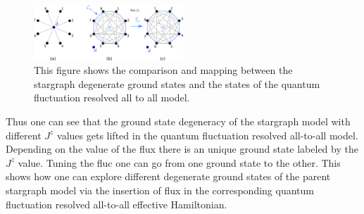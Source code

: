 \documentclass[reprint,prb,superscriptaddress]{revtex4-2}
\begin{document}
\begin{figure}[!hb]
\centering
\includegraphics[width=0.5\textwidth]{plt/stargraph-to-alltoall}
\caption{This figure shows the comparison and mapping between the stargraph degenerate ground states and the states of the quantum fluctuation resolved all to all model.}
\label{fig:stargraph-to-alltoall}
\end{figure}
Thus one can see that the ground state degeneracy of the stargraph model with different $J^z$ values gets lifted in the quantum fluctuation resolved all-to-all model. Depending on the value of the flux there is an unique ground state labeled by the $J^z$ value. Tuning the fluc one can go from one ground state to the other. This shows how one can explore different degenerate ground states of the parent stargraph model via the insertion of flux in the corresponding quantum fluctuation resolved all-to-all effective Hamiltonian.
\end{document}
